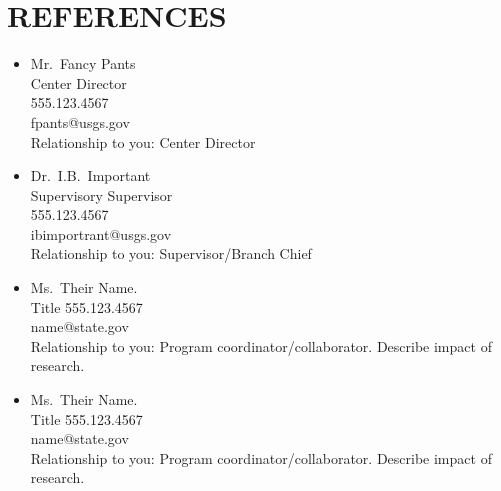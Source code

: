 \section*{REFERENCES}

\begin{multicols}{2}

  \begin{itemize}
  \item[] Mr.~Fancy Pants\\
    Center Director\\
    555.123.4567 \\
    fpants@usgs.gov \\
    {\color{gray} Relationship to you:} Center Director

    \item[] Dr.~I.B.~Important\\
    Supervisory Supervisor\\
    555.123.4567 \\
    ibimportrant@usgs.gov \\
    {\color{gray} Relationship to you:} Supervisor/Branch Chief

  \item[] Ms.~Their Name.\\
    Title
    555.123.4567 \\
    name@state.gov  \\
    {\color{gray} Relationship to you:} Program
    coordinator/collaborator. Describe impact of research.

    \item[] Ms.~Their Name.\\
    Title
    555.123.4567 \\
    name@state.gov  \\
    {\color{gray} Relationship to you:} Program
    coordinator/collaborator. Describe impact of research.
 
  \end{itemize}

  
\end{multicols}

